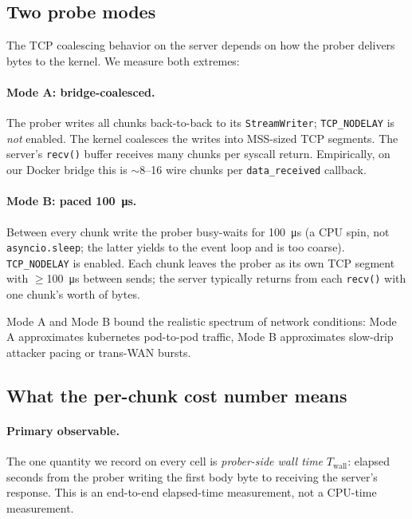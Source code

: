 \subsection{Two probe modes}
\label{sec:method-modes}

The TCP coalescing behavior on the server depends on how the prober
delivers bytes to the kernel. We measure both extremes:

\paragraph{Mode A: bridge-coalesced.}
The prober writes all chunks back-to-back to its
\texttt{StreamWriter}; \texttt{TCP\_NODELAY} is \emph{not} enabled.
The kernel coalesces the writes into MSS-sized TCP segments. The
server's \texttt{recv()} buffer receives many chunks per syscall
return. Empirically, on our Docker bridge this is $\sim$8--16
wire chunks per \texttt{data\_received} callback.

\paragraph{Mode B: paced \SI{100}{\micro\second}.}
Between every chunk write the prober busy-waits for
\SI{100}{\micro\second} (a CPU spin, not \texttt{asyncio.sleep};
the latter yields to the event loop and is too coarse).
\texttt{TCP\_NODELAY} is enabled. Each chunk leaves the prober as
its own TCP segment with $\geq$\SI{100}{\micro\second} between
sends; the server typically returns from each \texttt{recv()} with
one chunk's worth of bytes.

Mode A and Mode B bound the realistic spectrum of network
conditions: Mode A approximates kubernetes pod-to-pod traffic,
Mode B approximates slow-drip attacker pacing or trans-WAN bursts.

\subsection{What the per-chunk cost number means}
\label{sec:method-metric}

\paragraph{Primary observable.}
The one quantity we record on every cell is \emph{prober-side wall
time} $T_\mathrm{wall}$: elapsed seconds from the prober writing
the first body byte to receiving the server's response. This is an
end-to-end elapsed-time measurement, not a CPU-time measurement.

